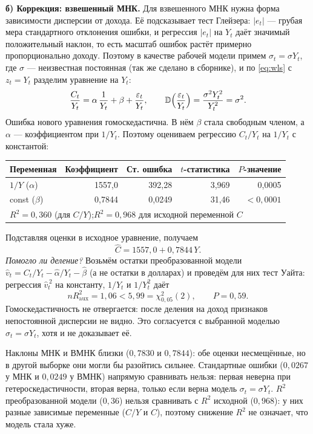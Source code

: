 \begin{solution}
\smallskip
\textbf{б) Коррекция: взвешенный МНК.} Для взвешенного МНК нужна форма
зависимости дисперсии от дохода. Её подсказывает тест Глейзера: $|e_t|$
— грубая мера стандартного отклонения ошибки, и регрессия $|e_t|$ на $Y_t$
даёт значимый положительный наклон, то есть масштаб ошибок растёт примерно
пропорционально доходу. Поэтому в качестве рабочей модели примем
$\sigma_t = \sigma Y_t$, где $\sigma$ — неизвестная постоянная (так же
сделано в сборнике), и по \eqref{eq:wls} с $z_t = Y_t$ разделим уравнение
на $Y_t$:
\[
  \frac{C_t}{Y_t} = \alpha\,\frac{1}{Y_t} + \beta + \frac{\varepsilon_t}{Y_t},
  \qquad
  \mathbb{D}\Bigl(\frac{\varepsilon_t}{Y_t}\Bigr) = \frac{\sigma^2Y_t^2}{Y_t^2} = \sigma^2 .
\]
Ошибка нового уравнения гомоскедастична. В нём $\beta$ стала свободным
членом, а $\alpha$ — коэффициентом при $1/Y_t$. Поэтому оцениваем регрессию
$C_t/Y_t$ на $1/Y_t$ с константой:
\begin{center}
\begin{tabular}{lrrrr}
\toprule
Переменная & Коэффициент & Ст. ошибка & $t$-статистика & $P$-значение \\
\midrule
$1/Y$ ($\alpha$) & 1557,0 & 392,28 & 3,969 & 0,0005 \\
const ($\beta$)  & 0,7844 & 0,0249 & 31,46 & $<0{,}0001$ \\
\midrule
\multicolumn{5}{l}{$R^2 = 0{,}360$ (для $C/Y$);\quad $R^2 = 0{,}968$ для исходной переменной $C$} \\
\bottomrule
\end{tabular}
\end{center}
Подставляя оценки в исходное уравнение, получаем
\[
  \widehat{C} = 1557{,}0 + 0{,}7844\,Y .
\]
\emph{Помогло ли деление?} Возьмём остатки преобразованной модели
$\widehat v_t=C_t/Y_t-\widehat\alpha/Y_t-\widehat\beta$ (а не остатки в
долларах) и проведём для них тест Уайта: регрессия $\widehat v_t^{\,2}$ на
константу, $1/Y_t$ и $1/Y_t^2$ даёт
\[
  nR^2_{\text{aux}} = 1{,}06 < 5{,}99 = \chi^2_{0{,}05}(2),
  \qquad P = 0{,}59 .
\]
Гомоскедастичность не отвергается: после деления на доход признаков
непостоянной дисперсии не видно. Это согласуется с выбранной моделью
$\sigma_t = \sigma Y_t$, хотя и не доказывает её.

\wlsresidualvisual

\begin{remark}
Наклоны МНК и ВМНК близки ($0{,}7830$ и $0{,}7844$): обе оценки
несмещённые, но в другой выборке они могли бы разойтись сильнее.
Стандартные ошибки ($0{,}0267$ у МНК и $0{,}0249$ у ВМНК) напрямую сравнивать
нельзя: первая неверна при гетероскедастичности, вторая верна, только если
верна модель $\sigma_t = \sigma Y_t$. $R^2$ преобразованной модели ($0{,}36$)
нельзя сравнивать с $R^2$ исходной ($0{,}968$): у них разные зависимые
переменные ($C/Y$ и $C$), поэтому снижение $R^2$ не означает, что модель
стала хуже.
\end{remark}
\end{solution}
